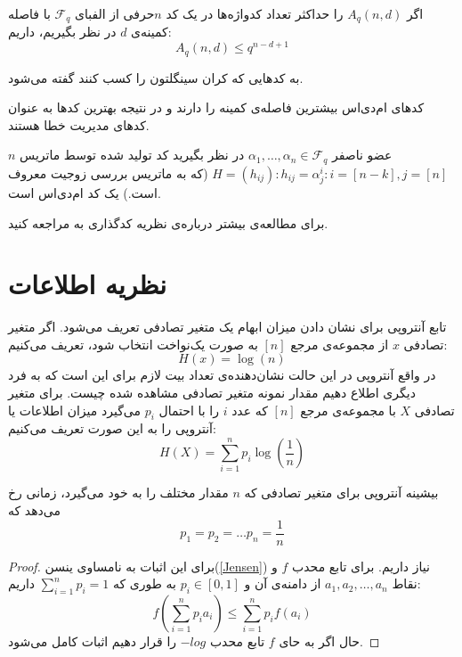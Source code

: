 \begin{definition}
	اگر
	$A_q(n, d)$
	را حداکثر تعداد کدواژه‌ها در یک کد
	$n$حرفی
 از الفبای
	$\mathcal{F}_q$
	با فاصله کمینه‌ی 
	$d$
	در نظر بگیریم، داریم:
	\begin{equation}
		A_q(n, d) \leq q^{n - d + 1}
	\end{equation}
	\cite{wiki:Singleton}
\end{definition}
\begin{definition}
	\label{def:mds}
	به کدهایی که کران سینگلتون را کسب کنند گفته می‌شود.
\end{definition}

کدهای ام‌دی‌اس بیشترین فاصله‌ی کمینه را دارند و در نتیجه بهترین کدها به عنوان کدهای مدیریت خطا هستند.
\begin{example}
	$n$
	عضو ناصفر
	$\alpha_1, \ldots, \alpha_n \in \mathcal{F}_q$
	در نظر بگیرید کد تولید شده توسط ماتریس 
	$H = (h_{ij}): h_{ij} = \alpha_j^i: i = [n - k], j = [n]$
	(که به ماتریس بررسی زوجیت معروف است.)	یک کد ام‌دی‌اس است.
\end{example}

	برای مطالعه‌ی بیشتر درباره‌ی نظریه کدگذاری به
\cite{book:coding}
مراجعه کنید.
\section{نظریه اطلاعات}
تابع آنتروپی برای نشان دادن میزان ابهام یک متغیر تصادفی تعریف می‌شود. اگر متغیر تصادفی
$x$
از مجموعه‌ی مرجع
$[n]$
به صورت یک‌نواخت انتخاب شود، تعریف می‌کنیم:
$$H(x) = \log(n)$$
در واقع آنتروپی در این حالت نشان‌دهنده‌ی تعداد بیت لازم برای این است که به فرد دیگری اطلاع دهیم مقدار نمونه متغیر تصادفی مشاهده شده چیست. برای متغیر تصادفی
$X$
با مجموعه‌ی مرجع
$[n]$
که عدد
$i$
را با احتمال
$p_i$
می‌گیرد میزان اطلاعات یا آنتروپی را به این صورت تعریف می‌کنیم:
$$H(X) = \sum_{i = 1}^{n} p_i \log(\frac{1}{n})$$

\begin{theorem}
بیشینه آنتروپی برای متغیر تصادفی که
$n$
مقدار مختلف را به خود می‌گیرد، زمانی رخ می‌دهد که
$$p_1 = p_2 = \dots p_n = \frac{1}{n}$$
\end{theorem}
\begin{proof}
برای این اثبات به نامساوی ینسن(\autoref{Jensen})
 نیاز داریم. برای تابع محدب
$f$
و نقاط
$a_1, a_2, \dots, a_n$
از دامنه‌ی آن و
$p_i \in [0, 1]$
به طوری که
$\sum_{i = 1}^{n} p_i = 1$
داریم:
$$f(\sum_{i = 1}^{n} p_i a_i) \leq \sum_{i = 1}^{n} p_i f(a_i)$$
حال اگر به حای
$f$
تابع محدب
$- log$
را قرار دهیم اثبات کامل می‌شود.
\end{proof}

